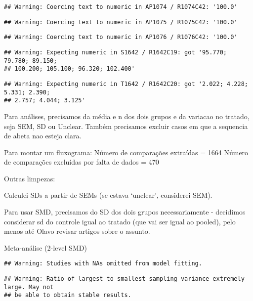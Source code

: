 \documentclass[
]{article}
\begin{document}
\begin{verbatim}
## Warning: Coercing text to numeric in AP1074 / R1074C42: '100.0'
\end{verbatim}

\begin{verbatim}
## Warning: Coercing text to numeric in AP1075 / R1075C42: '100.0'
\end{verbatim}

\begin{verbatim}
## Warning: Coercing text to numeric in AP1076 / R1076C42: '100.0'
\end{verbatim}

\begin{verbatim}
## Warning: Expecting numeric in S1642 / R1642C19: got '95.770; 79.780; 89.150;
## 100.200; 105.100; 96.320; 102.400'
\end{verbatim}

\begin{verbatim}
## Warning: Expecting numeric in T1642 / R1642C20: got '2.022; 4.228; 5.331; 2.390;
## 2.757; 4.044; 3.125'
\end{verbatim}

Para análises, precisamos da média e n dos dois grupos e da variacao no
tratado, seja SEM, SD ou Unclear. Também precisamos excluir casos em que
a sequencia de abeta nao esteja clara.

Para montar um fluxograma: Número de comparações extraídas = 1664 Número
de comparações excluídas por falta de dados = 470

Outras limpezas:

Calculei SDs a partir de SEMs (se estava `unclear', considerei SEM).

Para usar SMD, precisamos do SD dos dois grupos necessariamente -
decidimos considerar sd do controle igual ao tratado (que vai ser igual
ao pooled), pelo menos até Olavo revisar artigos sobre o assunto.

Meta-análise (2-level SMD)

\begin{verbatim}
## Warning: Studies with NAs omitted from model fitting.
\end{verbatim}

\begin{verbatim}
## Warning: Ratio of largest to smallest sampling variance extremely large. May not
## be able to obtain stable results.
\end{verbatim}
\end{document}
